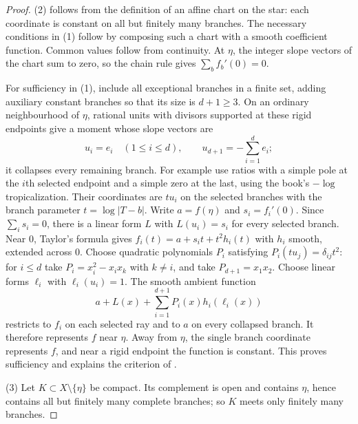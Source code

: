 \begin{proof}
(2) follows from the definition of an affine chart on the star: each
coordinate is constant on all but finitely many branches. The necessary
conditions in (1) follow by composing such a chart with a smooth
coefficient function. Common values follow from continuity. At $\eta$,
the integer slope vectors of the chart sum to zero, so the chain rule
gives $\sum_b f_b'(0)=0$.

For sufficiency in (1), include all exceptional branches in a finite
set, adding auxiliary constant branches so that its size is $d+1\ge3$.
On an ordinary neighbourhood of $\eta$, rational units with divisors
supported at these rigid endpoints give a moment whose slope vectors are
\[
 u_i=e_i\quad(1\le i\le d),\qquad
 u_{d+1}=-\sum_{i=1}^d e_i;
\]
it collapses every remaining branch. For example use ratios with a
simple pole at the $i$th selected endpoint and a simple zero at the last,
using the book's $-\log$ tropicalization. Their coordinates are $tu_i$
on the selected branches with the branch parameter $t=\log|T-b|$.
Write $a=f(\eta)$ and $s_i=f_i'(0)$. Since $\sum_i s_i=0$, there is a
linear form $L$ with $L(u_i)=s_i$ for every selected branch. Near $0$,
Taylor's formula gives
$f_i(t)=a+s_it+t^2h_i(t)$ with $h_i$ smooth, extended across $0$.
Choose quadratic polynomials $P_i$ satisfying
$P_i(tu_j)=\delta_{ij}t^2$: for $i\le d$ take
$P_i=x_i^2-x_ix_k$ with $k\ne i$, and take
$P_{d+1}=x_1x_2$. Choose linear forms $\ell_i$ with $\ell_i(u_i)=1$.
The smooth ambient function
\[
 a+L(x)+\sum_{i=1}^{d+1}P_i(x)h_i(\ell_i(x))
\]
restricts to $f_i$ on each selected ray and to $a$ on every collapsed
branch. It therefore represents $f$ near $\eta$. Away from $\eta$,
the single branch coordinate represents $f$, and near a rigid endpoint
the function is constant. This proves sufficiency and explains the
criterion of \cite[Example~6.7.3]{CLD25}.

(3) Let $K\subset X\setminus\{\eta\}$ be compact.  Its complement is open and
contains $\eta$, hence contains all but finitely many complete branches; so
$K$ meets only finitely many branches.
\end{proof}

